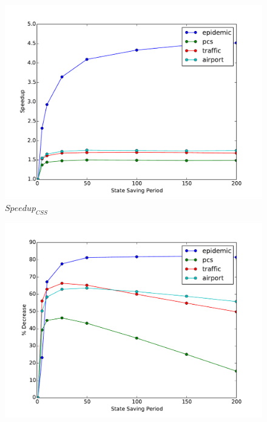 \documentclass[11pt]{book}
\begin{document}
\begin{figure}
  \begin{minipage}{.5\textwidth}
    \begin{center}
      \includegraphics[width=\textwidth,keepaspectratio,quiet]{figs/state_saving/bc/speedup.pdf} \\
      $Speedup_{CSS}$ \\
    \end{center}
  \end{minipage}%
  \hfill
  \begin{minipage}{.5\textwidth}
    \begin{center}
      \includegraphics[width=\textwidth,keepaspectratio,quiet]{figs/state_saving/bc/percent_memory_decrease.pdf} \\

\end{center}
\end{minipage}
\end{figure}
\end{document}
